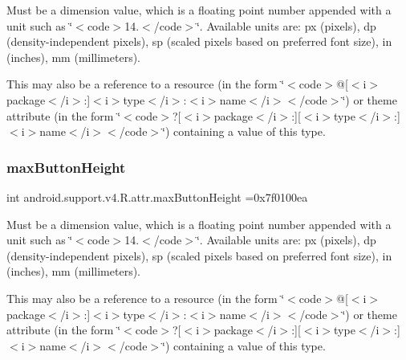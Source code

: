 Must be a dimension value, which is a floating point number appended with a unit such as \char`\"{}$<$code$>$14.\+5sp$<$/code$>$\char`\"{}. Available units are\+: px (pixels), dp (density-\/independent pixels), sp (scaled pixels based on preferred font size), in (inches), mm (millimeters). 

This may also be a reference to a resource (in the form \char`\"{}$<$code$>$@\mbox{[}$<$i$>$package$<$/i$>$\+:\mbox{]}$<$i$>$type$<$/i$>$\+:$<$i$>$name$<$/i$>$$<$/code$>$\char`\"{}) or theme attribute (in the form \char`\"{}$<$code$>$?\mbox{[}$<$i$>$package$<$/i$>$\+:\mbox{]}\mbox{[}$<$i$>$type$<$/i$>$\+:\mbox{]}$<$i$>$name$<$/i$>$$<$/code$>$\char`\"{}) containing a value of this type. \mbox{\label{classandroid_1_1support_1_1v4_1_1R_1_1attr_a1e32c821f0577ed221f1e619a58ef17b}} 
\subsubsection{\texorpdfstring{max\+Button\+Height}{maxButtonHeight}}
{\footnotesize\ttfamily int android.\+support.\+v4.\+R.\+attr.\+max\+Button\+Height =0x7f0100ea\hspace{0.3cm}{\ttfamily [static]}}

Must be a dimension value, which is a floating point number appended with a unit such as \char`\"{}$<$code$>$14.\+5sp$<$/code$>$\char`\"{}. Available units are\+: px (pixels), dp (density-\/independent pixels), sp (scaled pixels based on preferred font size), in (inches), mm (millimeters). 

This may also be a reference to a resource (in the form \char`\"{}$<$code$>$@\mbox{[}$<$i$>$package$<$/i$>$\+:\mbox{]}$<$i$>$type$<$/i$>$\+:$<$i$>$name$<$/i$>$$<$/code$>$\char`\"{}) or theme attribute (in the form \char`\"{}$<$code$>$?\mbox{[}$<$i$>$package$<$/i$>$\+:\mbox{]}\mbox{[}$<$i$>$type$<$/i$>$\+:\mbox{]}$<$i$>$name$<$/i$>$$<$/code$>$\char`\"{}) containing a value of this type. \mbox{\label{classandroid_1_1support_1_1v4_1_1R_1_1attr_a3fab112fbf63d1e882afbe1b156b4cb0}} 
